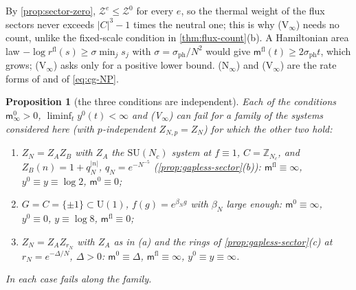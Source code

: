 \documentclass[11pt,a4paper]{amsart}
\newtheorem{proposition}[theorem]{Proposition}
\theoremstyle{definition}
\theoremstyle{remark}
\numberwithin{equation}{section}
\newcommand{\Z}{\mathbb{Z}}          %
\newcommand{\abs}[1]{\lvert #1\rvert}      %
\newcommand{\SU}{\mathrm{SU}}              %
\newcommand{\U}{\mathrm{U}}                %
\newcommand{\TT}{\mathbb{T}}               %
\newcommand{\Zc}{\mathcal{Z}}              %
\newcommand{\Mcirc}{\text{\upshape(M$^{\circ}$)}}   %
\newcommand{\hypN}{\text{\upshape(N)}}              %
\newcommand{\hypP}{\text{\upshape(P)}}              %
\begin{document}
By \cref{prop:sector-zero}, $\Zc^e\le\Zc^0$ for every $e$, so the thermal weight of the flux sectors never exceeds $\abs{C}^3-1$ times the neutral one; this is why \textup{(V$_\infty$)} needs no count, unlike the fixed-scale condition \hypP{} in \cref{thm:flux-count}\textup{(b)}. A Hamiltonian area law $-\log r^{\mathrm{fl}}(s)\ge\sigma\min_js_j$ with $\sigma=\sigma_{\mathrm{ph}}/N^2$ would give $\mathsf m^{\mathrm{fl}}(t)\ge2\sigma_{\mathrm{ph}}t$, which grows; \textup{(V$_\infty$)} asks only for a positive lower bound. \textup{(N$_\infty$)} and \textup{(V$_\infty$)} are the rate forms of \hypN{} and \hypP{} of \eqref{eq:cg-NP}.

\begin{proposition}[the three conditions are independent]\label{prop:criterion-independence}
Each of the conditions $\mathsf m^0_\infty>0$, $\liminf_ty^0(t)<\infty$ and \textup{(V$_\infty$)} can fail for a family of the systems considered here \textup{(}with $p$-independent $Z_{N,p}=Z_N$\textup{)} for which the other two hold:
\begin{enumerate}[label=\textup{(\alph*)},leftmargin=*]
\item $Z_N=Z_AZ_B$ with $Z_A$ the $\SU(N_c)$ system at $f\equiv1$, $C=\Z_{N_c}$, and $Z_B(n)=1+q_N^{\abs n}$, $q_N=e^{-N^{-5}}$ \textup{(}\cref{prop:gapless-sector}\textup{(b)}\textup{)}: $\mathsf m^{\mathrm{fl}}\equiv\infty$, $y^0\equiv y\equiv\log2$, $\mathsf m^0\equiv0$;
\item $G=C=\{\pm1\}\subset\U(1)$, $f(g)=e^{\beta_Ng}$ with $\beta_N$ large enough: $\mathsf m^0\equiv\infty$, $y^0\equiv0$, $y\equiv\log8$, $\mathsf m^{\mathrm{fl}}\equiv0$;
\item $Z_N=Z_AZ_{r_N}$ with $Z_A$ as in \textup{(a)} and the rings of \cref{prop:gapless-sector}\textup{(c)} at $r_N=e^{-\Delta/N}$, $\Delta>0$: $\mathsf m^0\equiv\Delta$, $\mathsf m^{\mathrm{fl}}\equiv\infty$, $y^0\equiv y\equiv\infty$.
\end{enumerate}
In each case \Mcirc{} fails along the family.
\end{proposition}
\end{document}
